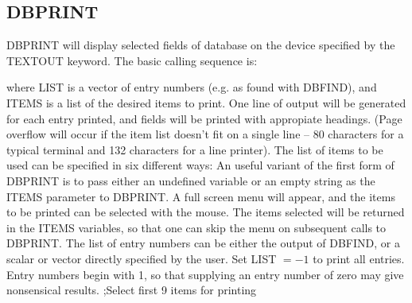 \subsection{DBPRINT}

DBPRINT will display selected fields of database on the device specified
by the TEXTOUT keyword.  The basic calling sequence is:

where LIST is a vector of entry numbers (e.g. as found with DBFIND), and 
ITEMS is a list of the desired items to print.   One line of output will
be generated for each entry printed, and fields will be printed with
appropiate headings.  (Page overflow will occur if the item list doesn't
fit on a single line -- 80 characters for a typical terminal and 132 
characters for a line printer).  The list of items to be used can
be specified in six different ways:
\exbegin
{}
\exend
An useful variant of the first form of DBPRINT is to pass
either an undefined variable or an empty string as the ITEMS parameter
to DBPRINT.   A full screen menu will appear, and the items to be printed
can be selected with the mouse.  The items selected will be returned
in the ITEMS variables, so that one can skip the menu on subsequent calls
to DBPRINT.
\exbegin
{}
\exend
The list of entry numbers can be either the output of DBFIND, or a scalar
or vector directly specified by the user.  Set LIST $= -1$ to print all 
entries.  Entry numbers begin with 1, so that supplying an entry number
of zero may give nonsensical results.
\exbegin
{}
 {;Select first 9 items for printing}
\exend

